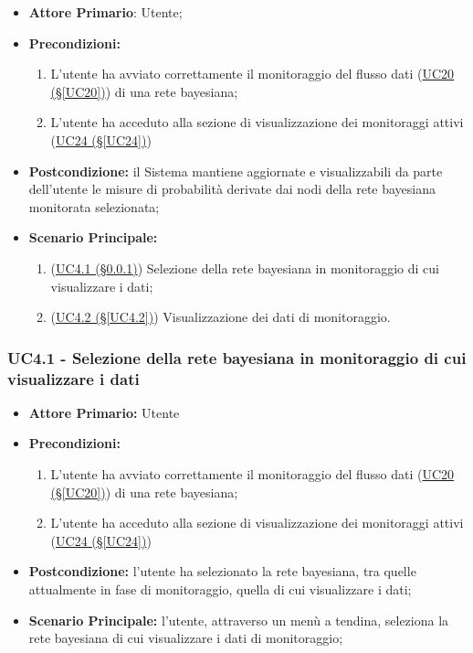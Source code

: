 \begin{itemize}
	\item \textbf{Attore Primario}: Utente;
	\item \textbf{Precondizioni:}
	\begin{enumerate}
		\item L'utente ha avviato correttamente il monitoraggio del flusso dati (\hyperref[UC20]{UC20 (§\ref*{UC20})}) di una rete bayesiana;
		\item L'utente ha acceduto alla sezione di visualizzazione dei monitoraggi attivi (\hyperref[UC24]{UC24 (§\ref*{UC24})})
	\end{enumerate}	 
	\item \textbf{Postcondizione:} il Sistema mantiene aggiornate e visualizzabili da parte dell'utente le misure di probabilità derivate dai nodi della rete bayesiana monitorata selezionata;
	\item \textbf{Scenario Principale:} 
	\begin{enumerate}
		\item (\hyperref[UC4.1]{UC4.1 (§\ref*{UC4.1})}) Selezione della rete bayesiana in monitoraggio di cui visualizzare i dati;
		\item (\hyperref[UC4.2]{UC4.2 (§\ref*{UC4.2})}) Visualizzazione dei dati di monitoraggio.
	\end{enumerate}
\end{itemize}

\pagebreak

\subsubsection{UC4.1 - Selezione della rete bayesiana in monitoraggio di cui visualizzare i dati}\label{UC4.1}

\begin{itemize}
	\item \textbf{Attore Primario:} Utente
	\item \textbf{Precondizioni:} 
	\begin{enumerate}
		\item L'utente ha avviato correttamente il monitoraggio del flusso dati (\hyperref[UC20]{UC20 (§\ref*{UC20})}) di una rete bayesiana;
		\item L'utente ha acceduto alla sezione di visualizzazione dei monitoraggi attivi (\hyperref[UC24]{UC24 (§\ref*{UC24})})
	\end{enumerate}	 
	\item \textbf{Postcondizione:} l'utente ha selezionato la rete bayesiana, tra quelle attualmente in fase di monitoraggio, quella di cui visualizzare i dati;
	\item \textbf{Scenario Principale:} l'utente, attraverso un menù a tendina, seleziona la rete bayesiana di cui visualizzare i dati di monitoraggio;
\end{itemize}

